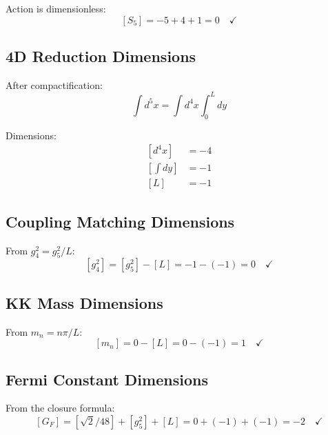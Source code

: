 \documentclass[11pt,a4paper]{article}
\begin{document}
Action is dimensionless:
\begin{equation}
\label{eq:action-dim-check}
[S_5] = -5 + 4 + 1 = 0 \quad \checkmark
\end{equation}

\subsection{4D Reduction Dimensions}
\label{app:4d-reduction-dim}

After compactification:
\begin{equation}
\label{eq:4d-reduction}
\int d^5x = \int d^4x \int_0^L dy
\end{equation}

Dimensions:
\begin{align}
\label{eq:dim-d4x}
[d^4x] &= -4 \\
\label{eq:dim-dy}
[\int dy] &= -1 \\
\label{eq:dim-L-detail}
[L] &= -1
\end{align}

\subsection{Coupling Matching Dimensions}
\label{app:coupling-dim}

From $g_4^2 = g_5^2/L$:
\begin{equation}
\label{eq:g4-dim-detail}
[g_4^2] = [g_5^2] - [L] = -1 - (-1) = 0 \quad \checkmark
\end{equation}

\subsection{KK Mass Dimensions}
\label{app:kk-dim}

From $m_n = n\pi/L$:
\begin{equation}
\label{eq:mn-dim-detail}
[m_n] = 0 - [L] = 0 - (-1) = 1 \quad \checkmark
\end{equation}

\subsection{Fermi Constant Dimensions}
\label{app:gf-dim-detail}

From the closure formula:
\begin{equation}
\label{eq:gf-dim-breakdown}
[G_F] = [\sqrt{2}/48] + [g_5^2] + [L] = 0 + (-1) + (-1) = -2 \quad \checkmark
\end{equation}
\end{document}
